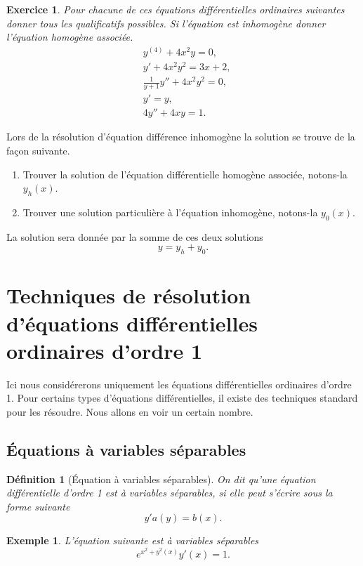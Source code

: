 \documentclass[a4paper,12pt]{book}
\newtheorem{definition}{Définition}
\newtheorem*{exemple}{Exemple}
\newtheorem*{exercice}{Exercice}
\begin{document}
\begin{exercice}
 Pour chacune de ces équations différentielles ordinaires suivantes donner tous les qualificatifs possibles.
 Si l'équation est inhomogène donner l'équation homogène associée.
 \begin{align}
  &y^{(4)}+4x^2 y=0,\\
  &y'+4x^2 y^2=3x+2,\\
  &\frac{1}{y+1}y''+4x^2 y^2=0,\\
  &y'=y,\\
  &4y''+4x y=1.
 \end{align}
\end{exercice}
Lors de la résolution d'équation différence inhomogène la solution se trouve de la façon suivante.
\begin{enumerate}
 \item Trouver la solution de l'équation différentielle homogène associée, notons-la $y_h(x)$.
 \item Trouver une solution particulière à l'équation inhomogène, notons-la $y_0(x)$.
\end{enumerate}
La solution sera donnée par la somme de ces deux solutions
\begin{equation}
 y=y_h+y_0.
\end{equation}



\section{Techniques de résolution d'équations différentielles ordinaires d'ordre 1}

Ici nous considérerons uniquement les équations différentielles ordinaires d'ordre 1. 
Pour certains types d'équations différentielles, il existe des techniques standard pour 
les résoudre. Nous allons en voir un certain nombre.

\subsection{Équations à variables séparables}

\begin{definition}[Équation à variables séparables]
On dit qu'une équation différentielle d'ordre 1 est à variables séparables, si elle peut s'écrire sous la forme suivante
\begin{equation}
 y' a(y)=b(x).
\end{equation}
\end{definition}
\begin{exemple}
 L'équation suivante est à variables séparables
 \begin{equation}
  e^{x^2+y^2(x)}y'(x)=1.
 \end{equation}

\end{exemple}
\end{document}
